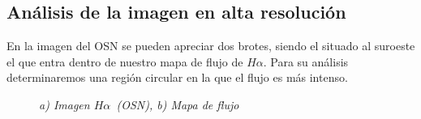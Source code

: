 \documentclass{article}
\newcommand{\hal}{$H\alpha$}
\begin{document}
\subsection{Análisis de la imagen en alta resolución}
En la imagen del OSN se pueden apreciar dos brotes, siendo el situado al suroeste el que entra dentro de nuestro mapa de flujo de \hal. Para su análisis determinaremos una región circular en la que el flujo es más intenso.
\begin{figure}[H]
	\centering
	\caption{\emph{a) Imagen \hal\ (OSN), b) Mapa de flujo}}
	\label{figura 4}
\end{figure} 
\end{document}
